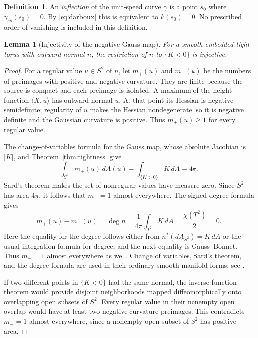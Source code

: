 \documentclass[11pt]{amsart}
\newtheorem{lemma}[theorem]{Lemma}
\theoremstyle{definition}
\newtheorem{definition}[theorem]{Definition}
\begin{document}
\begin{definition}\label{def:inflection}
An \emph{inflection} of the unit-speed curve $\gamma$ is a point
$s_0$ where $\gamma_{ss}(s_0)=0$. By \eqref{eq:darboux} this is
equivalent to $k(s_0)=0$. No prescribed order of vanishing is
included in this definition.
\end{definition}

\begin{lemma}[Injectivity of the negative Gauss map]\label{lem:gauss}
For a smooth embedded tight torus with outward normal $n$, the
restriction of $n$ to $\{K<0\}$ is injective.
\end{lemma}
\begin{proof}
For a regular value $u\in S^2$ of $n$, let $m_+(u)$ and $m_-(u)$
be the numbers of preimages with positive and negative curvature.
They are finite because the source is compact and each preimage
is isolated. A maximum of the height function $\langle X,u\rangle$
has outward normal $u$. At that point its Hessian is negative
semidefinite; regularity of $u$ makes the Hessian nondegenerate,
so it is negative definite and the Gaussian curvature is positive.
Thus $m_+(u)\ge1$ for every regular value.

The change-of-variables formula for the Gauss map, whose absolute
Jacobian is $|K|$, and Theorem~\ref{thm:tightness} give
\[
 \int_{S^2}m_+(u)\,dA(u)=\int_{\{K>0\}}K\,dA=4\pi .
\]
Sard's theorem makes the set of nonregular values have measure zero.
Since $S^2$ has area $4\pi$, it follows that $m_+=1$ almost
everywhere. The signed-degree formula gives
\[
 m_+(u)-m_-(u)=\deg n
 =\frac1{4\pi}\int_{T^2}K\,dA=\frac{\chi(T^2)}2=0.
\]
Here the equality for the degree follows either from
$n^*(dA_{S^2})=K\,dA$ or the usual integration formula for degree,
and the next equality is Gauss--Bonnet. Thus $m_-=1$ almost
everywhere as well. Change of variables, Sard's theorem, and the
degree formula are used in their ordinary smooth-manifold forms;
see \cite[Chapters~6 and~17]{Lee}.

If two different points in $\{K<0\}$ had the same normal, the inverse
function theorem would provide disjoint neighborhoods mapped
diffeomorphically onto overlapping open subsets of $S^2$.
Every regular value in their nonempty open overlap would have at
least two negative-curvature preimages. This contradicts $m_-=1$
almost everywhere, since a nonempty open subset of $S^2$ has
positive area.
\end{proof}
\end{document}
